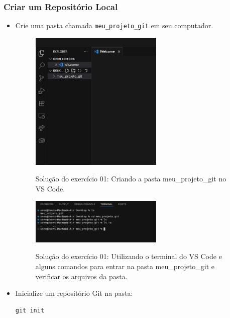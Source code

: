 \subsubsection{Criar um Repositório Local}
\begin{itemize}
    \item Crie uma pasta chamada \texttt{meu\_projeto\_git} em seu computador.

    \begin{figure}[H]
        \centering
        \includegraphics[width=0.6\textwidth]{imgs/tutorial_github/ex01_01.png}
        \label{fig:ex01_01}
        \caption{Solução do exercício 01: Criando a pasta meu\_projeto\_git no VS Code.}
    \end{figure}

    \begin{figure}[H]
        \centering
        \includegraphics[width=0.6\textwidth]{imgs/tutorial_github/ex01_01_1.png}
        \label{fig:ex01_01_01}
        \caption{Solução do exercício 01: Utilizando o terminal do VS Code e alguns comandos para entrar na pasta meu\_projeto\_git e verificar os arquivos da pasta.}
    \end{figure}


    \item Inicialize um repositório Git na pasta:
    \begin{lstlisting}[style=shellstyle]
git init
    \end{lstlisting}



\end{itemize}
